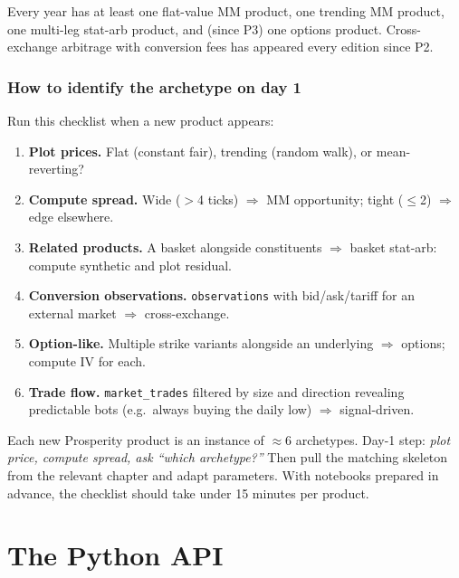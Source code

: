 Every year has at least one flat-value MM product, one trending MM
product, one multi-leg stat-arb product, and (since P3) one options
product.  Cross-exchange arbitrage with conversion fees has appeared
every edition since P2.

\subsubsection*{How to identify the archetype on day 1}

Run this checklist when a new product appears:

\begin{enumerate}
  \item \textbf{Plot prices.}  Flat (constant fair), trending (random
  walk), or mean-reverting?
  \item \textbf{Compute spread.}  Wide ($>$4 ticks) $\Rightarrow$ MM
  opportunity; tight ($\le$2) $\Rightarrow$ edge elsewhere.
  \item \textbf{Related products.}  A basket alongside constituents
  $\Rightarrow$ basket stat-arb: compute synthetic and plot residual.
  \item \textbf{Conversion observations.}  \texttt{observations} with
  bid/ask/tariff for an external market $\Rightarrow$ cross-exchange.
  \item \textbf{Option-like.}  Multiple strike variants alongside an
  underlying $\Rightarrow$ options; compute IV for each.
  \item \textbf{Trade flow.}  \texttt{market\_trades} filtered by size
  and direction revealing predictable bots (e.g.\ always buying the
  daily low) $\Rightarrow$ signal-driven.
\end{enumerate}

\begin{intuitionbox}
Each new Prosperity product is an instance of $\approx$6 archetypes.
Day-1 step: \emph{plot price, compute spread, ask ``which archetype?''}
Then pull the matching skeleton from the relevant chapter and adapt
parameters.  With notebooks prepared in advance, the checklist should
take under 15 minutes per product.
\end{intuitionbox}

\section{The Python API}
\label{sec:prosperity_api}

